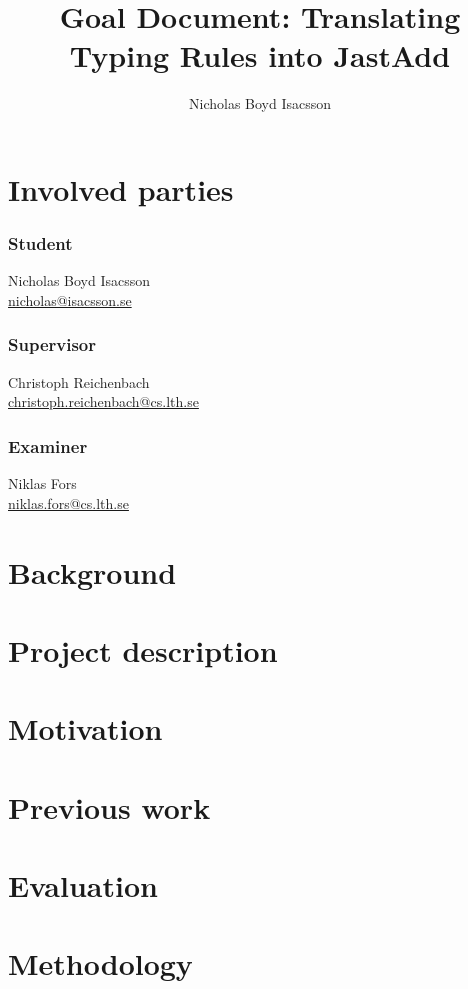\documentclass{article}
\title{Goal Document: Translating Typing Rules into JastAdd}
\author{Nicholas Boyd Isacsson}
\begin{document}
\maketitle

\section{Involved parties}
\subsubsection*{Student}
Nicholas Boyd Isacsson\\ \href{mailto:nicholas@isacsson.se}{nicholas@isacsson.se}
\\
\subsubsection*{Supervisor}
Christoph Reichenbach \\ \href{mailto:christoph.reichenbach@cs.lth.se}{christoph.reichenbach@cs.lth.se}

\subsubsection*{Examiner}
Niklas Fors \\ \href{mailto:niklas.fors@cs.lth.se}{niklas.fors@cs.lth.se}

\section{Background}


\section{Project description}


\section{Motivation}


\section{Previous work}


\section{Evaluation}


\section{Methodology}
\end{document}
